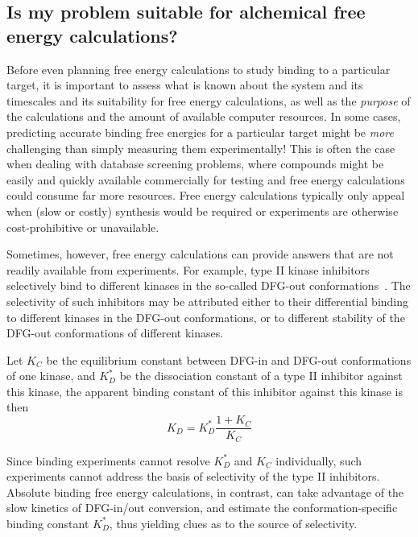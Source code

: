 \documentclass[9pt,bestpractices]{livecoms}
\begin{document}
\subsection{Is my problem suitable for alchemical free energy calculations?}
\label{subsec:suitability}
Before even planning free energy calculations to study binding to a
particular target, it is important to assess what is known about the
system and its timescales and its suitability for free energy
calculations, as well as the \emph{purpose} of the calculations and
the amount of available computer resources. In some cases, predicting accurate binding free energies for a particular target might be
\emph{more} challenging than simply measuring them experimentally! This is
often the case when dealing with database screening problems, where
compounds might be easily and quickly available commercially for
testing and free energy calculations could consume far more resources. Free energy calculations typically only
appeal when (slow or costly) synthesis would be required or experiments are otherwise cost-prohibitive or unavailable.

Sometimes, however, free energy calculations can provide answers that are not
readily available from experiments. For example, type II kinase
inhibitors selectively bind to different kinases in the so-called
DFG-out conformations~\cite{schindler2000structural}. The selectivity of such
inhibitors may be attributed either to their differential binding to
different kinases in the DFG-out conformations, or to different
stability of the DFG-out conformations of different kinases. 

Let
$K_C$ be the equilibrium constant between DFG-in and DFG-out
conformations of one kinase, and $K_D^\ast$ be the dissociation
constant of a type II inhibitor against this kinase, the apparent
binding constant of this inhibitor against this kinase is then
\begin{equation}
  K_D = K_D^\ast \frac{1 + K_C}{K_C}
  \label{eqn:conformational-binding}
\end{equation}

Since binding experiments cannot resolve $K_D^\ast$ and $K_C$ individually, such experiments cannot address the basis of selectivity of the type II inhibitors. Absolute binding free energy calculations, in contrast, can take advantage of the slow kinetics of DFG-in/out conversion, and estimate the conformation-specific binding constant $K_D^\ast$, thus yielding clues as to the source of selectivity.

%
%
\end{document}
